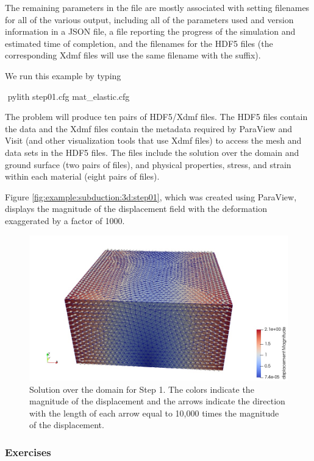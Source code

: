 The remaining parameters in the  file are mostly
associated with setting filenames for all of the various output,
including all of the parameters used and version information in a JSON
file, a file reporting the progress of the simulation and estimated
time of completion, and the filenames for the HDF5 files (the
corresponding Xdmf files will use the same filename with the
 suffix).

We run this example by typing
\begin{shell}
$$ pylith step01.cfg mat_elastic.cfg
\end{shell}
The problem will produce ten pairs of HDF5/Xdmf files. The HDF5
files contain the data and the Xdmf files contain the metadata required
by ParaView and Visit (and other visualization tools that
use Xdmf files) to access the mesh and data sets in the HDF5 files.
The files include the solution over the domain and ground surface
(two pairs of files), and physical properties, stress, and strain within
each material (eight pairs of files). 

Figure \vref{fig:example:subduction:3d:step01}, which was created using
ParaView, displays the magnitude of the displacement field with the
deformation exaggerated by a factor of 1000. 

\begin{figure}
  \includegraphics[width=5.0in]{examples/figs/subduction3d_step01_soln}
  \caption{Solution over the domain for Step 1. The colors indicate
    the magnitude of the displacement and the arrows indicate the
    direction with the length of each arrow equal to 10,000 times the
    magnitude of the displacement.}
  \label{fig:example:subduction:3d:step01}
\end{figure}


\subsubsection{Exercises}


